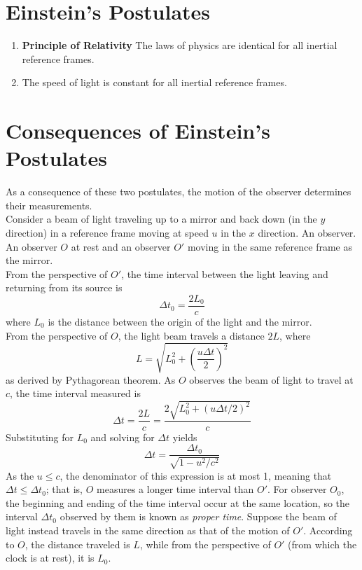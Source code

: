 \documentclass{subfiles}
\begin{document}
	\section{Einstein's Postulates}
		\begin{enumerate}
			\item \textbf{Principle of Relativity} 
				The laws of physics are identical for all inertial reference frames.
			\item 
				The speed of light is constant for all inertial reference frames.
		\end{enumerate}
	\section{Consequences of Einstein's Postulates}
		As a consequence of these two postulates, the motion of the observer determines their measurements. \\
			Consider a beam of light traveling up to a mirror and back down (in the \(y\) direction) in a reference frame moving at speed \(u\) in the \(x\) direction. An observer. An observer \(O\) at rest and an observer \(O'\) moving in the same reference frame as the mirror. \\
				From the perspective of \(O'\), the time interval between the light leaving and returning from its source is
				\[\Delta t_0 = \frac{2L_0}{c}\]
				where \(L_0\) is the distance between the origin of the light and the mirror. \\
				From the perspective of \(O\), the light beam travels a distance \(2L\), where
				\[L = \sqrt{L_0^2 + \left(\frac{u\Delta t}{2}\right)^2}\]
				as derived by Pythagorean theorem. As \(O\) observes the beam of light to travel at \(c\), the time interval measured is
				\[
					\Delta t = \frac{2L}{c} 
						= \frac{2\sqrt{L_0^2 + (u\Delta t/2)^2}}{c}
				\]
				Substituting for \(L_0\) and solving for \(\Delta t\) yields
				\[\Delta t = \frac{\Delta t_0}{\sqrt{1 - u^2/c^2}} \tag{time dilation}\]
				As the \(u \le c\), the denominator of this expression is at most 1, meaning that \(\Delta t \le \Delta t_0\); that is, \(O\) measures a longer time interval than \(O'\). For observer \(O_0\), the beginning and ending of the time interval occur at the same location, so the interval \(\Delta t_0\) observed by them is known as \textit{proper time}.
			Suppose the beam of light instead travels in the same direction as that of the motion of \(O'\). According to \(O\), the distance traveled is \(L\), while from the perspective of \(O'\) (from which the clock is at rest), it is \(L_0\). \\
\end{document}
